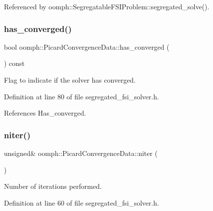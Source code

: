Referenced by oomph\+::\+Segregatable\+F\+S\+I\+Problem\+::segregated\+\_\+solve().

\mbox{\label{classoomph_1_1PicardConvergenceData_aa575a19693f4f00f2981e418d2176310}} 
\subsubsection{\texorpdfstring{has\+\_\+converged()}{has\_converged()}}
{\footnotesize\ttfamily bool oomph\+::\+Picard\+Convergence\+Data\+::has\+\_\+converged (\begin{DoxyParamCaption}{ }\end{DoxyParamCaption}) const\hspace{0.3cm}{\ttfamily [inline]}}



Flag to indicate if the solver has converged. 



Definition at line 80 of file segregated\+\_\+fsi\+\_\+solver.\+h.



References Has\+\_\+converged.

\mbox{\label{classoomph_1_1PicardConvergenceData_a24be0531f3c97ca7daf7d482ce1a99f9}} 
\subsubsection{\texorpdfstring{niter()}{niter()}}
{\footnotesize\ttfamily unsigned\& oomph\+::\+Picard\+Convergence\+Data\+::niter (\begin{DoxyParamCaption}{ }\end{DoxyParamCaption})\hspace{0.3cm}{\ttfamily [inline]}}



Number of iterations performed. 



Definition at line 60 of file segregated\+\_\+fsi\+\_\+solver.\+h.



